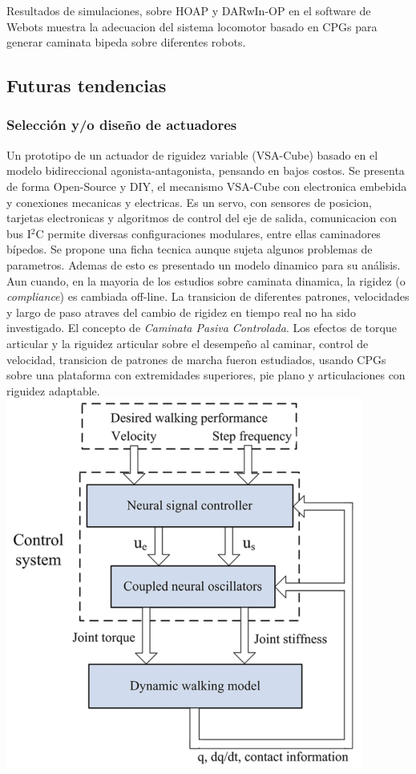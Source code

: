 \documentclass[10pt,onecolumn,twoside,letterpaper]{article}
\begin{document}
Resultados de simulaciones, sobre HOAP y DARwIn-OP en el software de Webots muestra la adecuacion del sistema locomotor basado en CPGs para generar caminata bipeda sobre diferentes robots.\cite{Matos2014}
\subsection{Futuras tendencias}
\subsubsection{Selecci\'on y/o dise\~no de actuadores}
Un prototipo de un actuador de riguidez variable (VSA-Cube) basado en el modelo bidireccional agonista-antagonista, pensando en bajos costos. Se presenta de forma Open-Source y DIY, el mecanismo VSA-Cube con electronica embebida y conexiones mecanicas y electricas. Es un servo, con sensores de posicion, tarjetas electronicas y algoritmos de control del eje de salida, comunicacion con bus I$^2$C permite diversas configuraciones modulares, entre ellas caminadores b\'ipedos. Se propone una ficha tecnica aunque sujeta algunos problemas de parametros. Ademas de esto es presentado un modelo dinamico para su an\'alisis.\cite{Catalano2011}
Aun cuando, en la mayoria de los estudios sobre caminata dinamica, la rigidez (o \emph{compliance}) es cambiada off-line. La transicion de diferentes patrones, velocidades y largo de paso atraves del cambio de rigidez en tiempo real no ha sido investigado. El concepto de \emph{Caminata Pasiva Controlada}. Los efectos de torque articular y la riguidez articular sobre el desempe\~no al caminar, control de velocidad, transicion de patrones de marcha fueron estudiados, usando CPGs sobre una plataforma con extremidades superiores, pie plano y articulaciones con riguidez adaptable.\cite{Huang2014}\\
\includegraphics[scale=0.4]{../../images/CPG-PWD-VIA.png}\cite{Huang2014}
\end{document}
